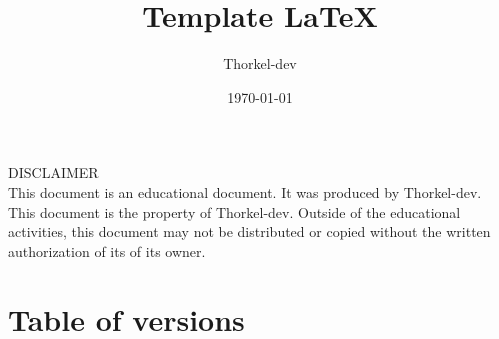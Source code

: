 \documentclass[a4paper,11pt,titlepage]{article}
\author{Thorkel-dev}        %
\title{Template \LaTeX}     %
\date{\normalsize\today}    %
\begin{document}
\maketitle

\BgThispage %
\vspace*{\fill}
\noindent
DISCLAIMER \\
This document is an educational document. It was produced by Thorkel-dev.
This document is the property of Thorkel-dev. Outside of the educational activities, this document may not be distributed or copied without the written authorization of its
of its owner.
\vspace*{\fill}
\clearpage

\section*{Table of versions}
 \label{TableOfVersion} %
\clearpage

\tableofcontents %







\printglossary[type=\acronymtype] \label{acronyms}
\glsaddallunused %

\printglossary[] \label{domaindictionary} %
\glsaddallunused %

\listoffigures \label{TableOfFigure} %

\listoflistings \label{TableOfCode} %

\printbibliography[heading=bibnumbered, label=bibliography] %
\nocite{*} %

\clearpage
\null
\thispagestyle{empty}%
\addtocounter{page}{-1}%
\BgThispage
\end{document}
